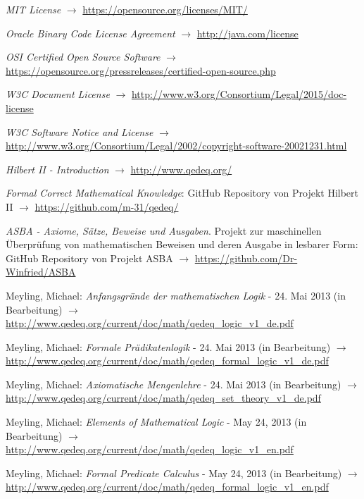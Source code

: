 \documentclass[english,ngerman,parskip=half,headsepline,footsepline]{scrreprt}
\begin{document}
\begin{flushleft}
\begin{thebibliography}{12}
			\emph{MIT License} $\rightarrow$ \url{https://opensource.org/licenses/MIT/}
			
			\emph{Oracle Binary Code License Agreement} $\rightarrow$ \url{http://java.com/license}
		
			\emph{OSI Certified Open Source Software} $\rightarrow$ \url{https://opensource.org/pressreleases/certified-open-source.php}
			
			\emph{W3C Document License} $\rightarrow$ \url{http://www.w3.org/Consortium/Legal/2015/doc-license}
			
			\emph{W3C Software Notice and License} $\rightarrow$ \url{http://www.w3.org/Consortium/Legal/2002/copyright-software-20021231.html}
			
			\emph{Hilbert II - Introduction} $\rightarrow$ \url{http://www.qedeq.org/}
			
			\emph{Formal Correct Mathematical Knowledge}: GitHub Repository von Projekt Hilbert II $\rightarrow$ \url{https://github.com/m-31/qedeq/}
			
			\emph{ASBA - Axiome, Sätze, Beweise und Ausgaben}. Projekt zur maschinellen Überprüfung von mathematischen Beweisen und deren Ausgabe in lesbarer Form: GitHub Repository von Projekt ASBA $\rightarrow$ \url{https://github.com/Dr-Winfried/ASBA}
			
			Meyling, Michael: \emph{Anfangsgründe der mathematischen Logik} - 24. Mai 2013 (in Bearbeitung) $\rightarrow$ \url{http://www.qedeq.org/current/doc/math/qedeq_logic_v1_de.pdf}
			
			Meyling, Michael: \emph{Formale Prädikatenlogik} - 24. Mai 2013 (in Bearbeitung) $\rightarrow$ \url{http://www.qedeq.org/current/doc/math/qedeq_formal_logic_v1_de.pdf}
			
			Meyling, Michael: \emph{Axiomatische Mengenlehre} - 24. Mai 2013 (in Bearbeitung) $\rightarrow$ \url{http://www.qedeq.org/current/doc/math/qedeq_set_theory_v1_de.pdf}
			
			Meyling, Michael: \emph{Elements of Mathematical Logic} - May 24, 2013 (in Bearbeitung) $\rightarrow$ \url{http://www.qedeq.org/current/doc/math/qedeq_logic_v1_en.pdf}
			
			Meyling, Michael: \emph{Formal Predicate Calculus} - May 24, 2013 (in Bearbeitung) $\rightarrow$ \url{http://www.qedeq.org/current/doc/math/qedeq_formal_logic_v1_en.pdf}
			

\end{thebibliography}
\end{flushleft}
\end{document}
